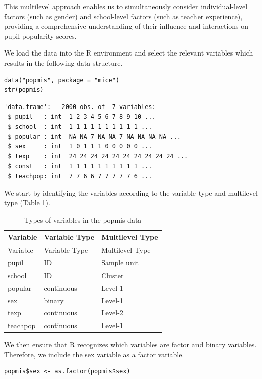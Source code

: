 \documentclass[
  article]{jss}
\begin{document}
This multilevel approach enables us to simultaneously consider
individual-level factors (such as gender) and school-level factors (such
as teacher experience), providing a comprehensive understanding of their
influence and interactions on pupil popularity scores.

We load the data into the R environment and select the relevant
variables which results in the following data structure.

\begin{verbatim}
data("popmis", package = "mice")
str(popmis)
\end{verbatim}

\begin{verbatim}
'data.frame':   2000 obs. of  7 variables:
 $ pupil   : int  1 2 3 4 5 6 7 8 9 10 ...
 $ school  : int  1 1 1 1 1 1 1 1 1 1 ...
 $ popular : int  NA NA 7 NA NA 7 NA NA NA NA ...
 $ sex     : int  1 0 1 1 1 0 0 0 0 0 ...
 $ texp    : int  24 24 24 24 24 24 24 24 24 24 ...
 $ const   : int  1 1 1 1 1 1 1 1 1 1 ...
 $ teachpop: int  7 7 6 6 7 7 7 7 7 6 ...
\end{verbatim}

We start by identifying the variables according to the variable type and
multilevel type (Table \ref{tbl-typepop}).

\begin{longtable}[]{@{}lll@{}}
\caption{Types of variables in the popmis
data}\label{tbl-typepop}\tabularnewline
\toprule\noalign{}
Variable & Variable Type & Multilevel Type \\
\midrule\noalign{}
\endfirsthead
\toprule\noalign{}
Variable & Variable Type & Multilevel Type \\
\midrule\noalign{}
\endhead
\bottomrule\noalign{}
\endlastfoot
pupil & ID & Sample unit \\
school & ID & Cluster \\
popular & continuous & Level-1 \\
sex & binary & Level-1 \\
texp & continuous & Level-2 \\
teachpop & continuous & Level-1 \\
\end{longtable}

We then ensure that R recognizes which variables are factor and binary
variables. Therefore, we include the sex variable as a factor variable.

\begin{verbatim}
popmis$sex <- as.factor(popmis$sex)
\end{verbatim}
\end{document}
